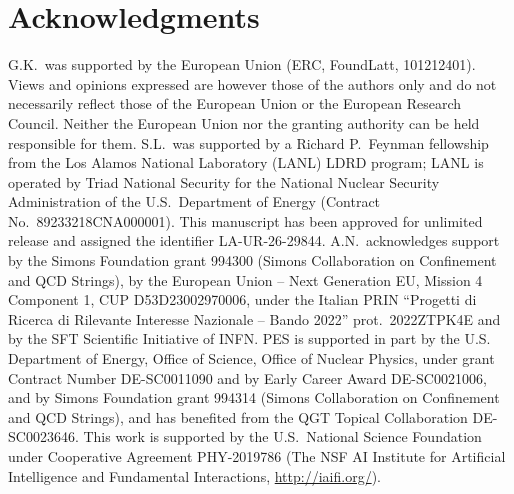 \documentclass[12pt]{article}
\begin{document}
\section*{Acknowledgments}

G.K.~was supported by the European Union (ERC, FoundLatt, 101212401). Views and opinions expressed are however those of the authors only and do not necessarily reflect those of the European Union or the European Research Council. Neither the European Union nor the granting authority can be held responsible for them.
S.L.~was supported by a Richard P.~Feynman fellowship from the Los Alamos National Laboratory (LANL) LDRD program; LANL is operated by Triad National Security for the National Nuclear Security Administration of the U.S.~Department of Energy (Contract No.~89233218CNA000001). This manuscript has been approved for unlimited release and assigned the identifier LA-UR-26-29844.
A.N.~acknowledges support by the Simons Foundation grant 994300 (Simons Collaboration on Confinement and QCD Strings), by the European Union -- Next Generation EU, Mission 4 Component 1, CUP D53D23002970006, under the Italian PRIN ``Progetti di Ricerca di Rilevante Interesse Nazionale -- Bando 2022'' prot.~2022ZTPK4E and by the SFT Scientific Initiative of INFN.
PES is supported in part by the U.S. Department of Energy, Office of Science, Office of Nuclear Physics, under grant Contract Number DE-SC0011090 and by Early Career Award DE-SC0021006, and by Simons Foundation grant 994314 (Simons Collaboration on Confinement and QCD Strings), and has benefited from the QGT Topical Collaboration
DE-SC0023646. 
This work is supported by the U.S.\ National Science Foundation under Cooperative Agreement PHY-2019786 (The NSF AI Institute for Artificial Intelligence and Fundamental Interactions, \url{http://iaifi.org/}).



\end{document}
